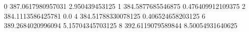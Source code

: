 0 387.0617980957031 2.950439453125
1 384.5877685546875 0.476409912109375
2 384.1113586425781 0.0
4 384.51788330078125 0.406524658203125
6 389.2684020996094 5.15704345703125
8 392.6119079589844 8.50054931640625
